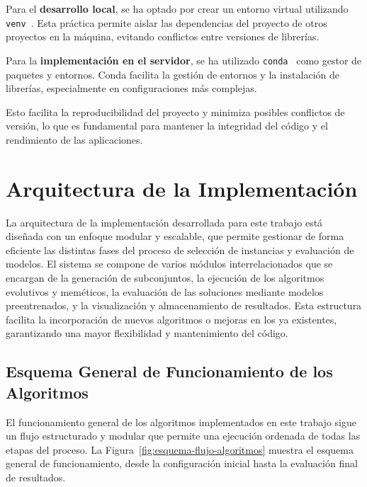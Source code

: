 Para el \textbf{desarrollo local}, se ha optado por crear un entorno virtual utilizando
\texttt{venv}~\cite{CreationVirtualEnvironments}.
Esta práctica permite aislar las dependencias del proyecto de otros proyectos en la máquina, evitando conflictos entre
versiones de librerías.

Para la \textbf{implementación en el servidor}, se ha utilizado \texttt{conda}~\cite{CondaDocumentation} como gestor
de paquetes y entornos.
Conda facilita la gestión de entornos y la instalación de librerías, especialmente en configuraciones más complejas.

Esto facilita la reproducibilidad del proyecto y minimiza posibles conflictos de versión, lo que es fundamental para
mantener la integridad del código y el rendimiento de las aplicaciones.


\section{Arquitectura de la Implementación}\label{sec:arquitectura-de-la-implementacion}
La arquitectura de la implementación desarrollada para este trabajo está diseñada con un enfoque modular y escalable,
que permite gestionar de forma eficiente las distintas fases del proceso de selección de instancias y evaluación de modelos.
El sistema se compone de varios módulos interrelacionados que se encargan de la generación de subconjuntos,
la ejecución de los algoritmos evolutivos y meméticos, la evaluación de las soluciones mediante modelos preentrenados, y la visualización y almacenamiento de resultados.
Esta estructura facilita la incorporación de nuevos algoritmos o mejoras en los ya existentes, garantizando una mayor flexibilidad y mantenimiento del código.

\subsection{Esquema General de Funcionamiento de los Algoritmos}\label{subsec:esquema-algoritmos}
El funcionamiento general de los algoritmos implementados en este trabajo sigue un flujo estructurado y modular que permite una ejecución ordenada de todas las etapas del proceso.
La Figura~\ref{fig:esquema-flujo-algoritmos} muestra el esquema general de funcionamiento, desde la configuración inicial hasta la evaluación final de resultados.


